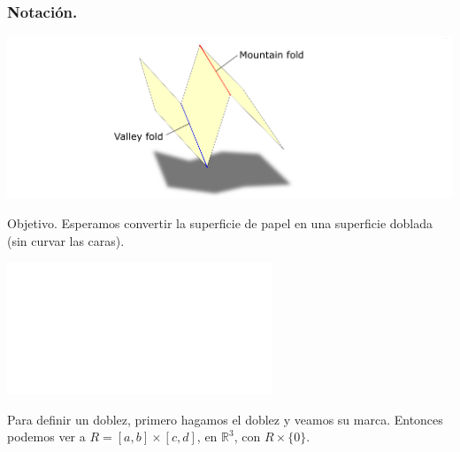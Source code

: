 \documentclass{beamer}
\begin{document}
\begin{frame}[t]
	\frametitle{Notación.}
	\begin{block}{}
		\begin{overprint}
			\includegraphics[width=  \linewidth, page = 1]{IMAGENES/1_DEF/10/S1}
		\end{overprint}
	\end{block}
	\vspace{3mm}
\end{frame}

\begin{frame}[t]
	\begin{exampleblock}{Objetivo.}
		Esperamos convertir la superficie de papel en una superficie doblada (sin curvar las caras).
	\end{exampleblock}
	\vspace{2mm}
	\begin{exampleblock}{}
		\begin{overprint}
		\includegraphics<1>[width= \linewidth]{IMAGENES/1_DEF/2/tikz.pdf}
		\end{overprint}
	\end{exampleblock}
	\vspace{2mm}
	\begin{exampleblock}{}
		{Para definir un doblez, primero hagamos el doblez y veamos su marca.}
		{Entonces podemos ver a \(R = [a,b] \times [c,d]\), en \(\mathbb{R} ^3\), con \(R \times \{0\}\).}
	\end{exampleblock}
\end{frame}
\end{document}
